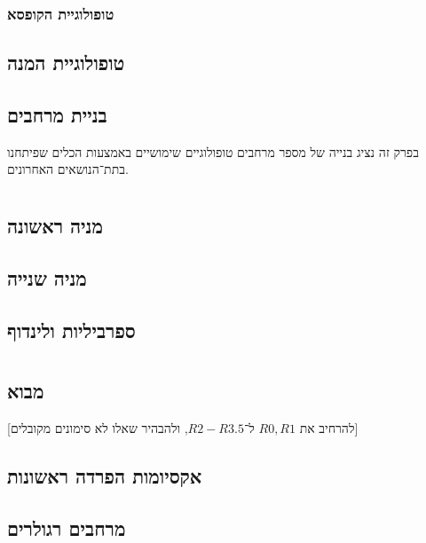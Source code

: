 \documentclass[name=רשימות טופולוגיה כללית]{../../../tex/classes/noChapterMegasumPreamble}
\begin{document}
	\subsubsection{\label{sss:boxTopo}טופולוגיית הקופסא}
	
	\subsection{\label{ss:quotientTopo}טופולוגיית המנה}
	\subsection{\label{ss:spaceBuild}בניית מרחבים}
	בפרק זה נציג בנייה של מספר מרחבים טופולוגיים שימושיים באמצעות הכלים שפיתחנו בתת־הנושאים האחרונים. 
	
	\npage
	\section[אקסיומות מניה]{\label{s:countability}}
	\subsection{\label{ss:ci}מניה ראשונה}
	\subsection{\label{ss:cii}מניה שנייה}
	\subsection{\label{ss:adolf}ספרביליות ולינדוף}
	
	\npage
	\section[אקסיומות הפרדה]{\label{s:seperation}}
	\subsection{\label{ss:overview}מבוא}
	[להרחיב את $R0, R1$ ל־$R2-R3.5$, ולהבהיר שאלו לא סימונים מקובלים]
	\subsection{\label{ss:t1-t2.5}אקסיומות הפרדה ראשונות}
	\subsection{\label{ss:t3}מרחבים רגולרים}
\end{document}
